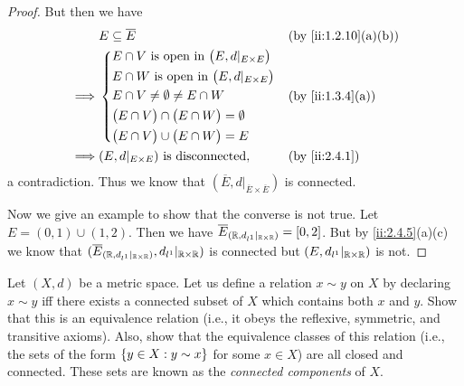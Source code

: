 \begin{proof}
  But then we have
  \begin{align*}
             & E \subseteq \overline{E}                                     &  & \by{ii:1.2.10}[a,b] \\
    \implies & \begin{dcases}
                 E \cap V \text{ is open in } \big(E, d|_{E \times E}\big) \\
                 E \cap W \text{ is open in } \big(E, d|_{E \times E}\big) \\
                 E \cap V \neq \emptyset \neq E \cap W                     \\
                 \big(E \cap V\big) \cap \big(E \cap W\big) = \emptyset    \\
                 \big(E \cap V\big) \cup \big(E \cap W\big) = E
               \end{dcases} &  & \by{ii:1.3.4}[a]                             \\
    \implies & (E, d|_{E \times E}) \text{ is disconnected},                &  & \by{ii:2.4.1}
  \end{align*}
  a contradiction.
  Thus we know that \((\overline{E}, d|_{\overline{E} \times \overline{E}})\) is connected.

  Now we give an example to show that the converse is not true.
  Let \(E = (0, 1) \cup (1, 2)\).
  Then we have \(\overline{E}_{(\mathbb{R}, d_{l^1}|_{\mathbb{R} \times \mathbb{R}})} = [0, 2]\).
  But by \cref{ii:2.4.5}(a)(c) we know that \((\overline{E}_{(\mathbb{R}, d_{l^1}|_{\mathbb{R} \times \mathbb{R}})}, d_{l^1}|_{\mathbb{R} \times \mathbb{R}})\) is connected but \((E, d_{l^1}|_{\mathbb{R} \times \mathbb{R}})\) is not.
\end{proof}

\begin{ex}\label{ii:ex:2.4.9}
  Let \((X, d)\) be a metric space. Let us define a relation \(x \sim y\) on \(X\) by declaring \(x \sim y\) iff there exists a connected subset of \(X\) which contains both \(x\) and \(y\).
  Show that this is an equivalence relation (i.e., it obeys the reflexive, symmetric, and transitive axioms).
  Also, show that the equivalence classes of this relation (i.e., the sets of the form \(\left\lbrace y \in  X : y \sim x\right\rbrace\) for some \(x \in X\)) are all closed and connected.
  These sets are known as the \emph{connected components} of \(X\).
\end{ex}

